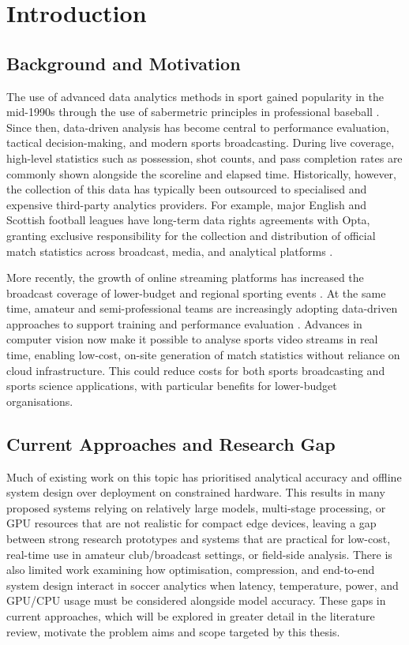\section{Introduction}
\subsection{Background and Motivation}
The use of advanced data analytics methods in sport gained popularity in the mid-1990s through the use of sabermetric principles in professional baseball \cite{Moneyball}. Since then, data-driven analysis has become central to performance evaluation, tactical decision-making, and modern sports broadcasting. During live coverage, high-level statistics such as possession, shot counts, and pass completion rates are commonly shown alongside the scoreline and elapsed time. Historically, however, the collection of this data has typically been outsourced to specialised and expensive third-party analytics providers. For example, major English and Scottish football leagues have long-term data rights agreements with Opta, granting exclusive responsibility for the collection and distribution of official match statistics across broadcast, media, and analytical platforms \cite{StatsPerform}.

More recently, the growth of online streaming platforms has increased the broadcast coverage of lower-budget and regional sporting events \cite{pwc_sports_streaming_2025}. At the same time, amateur and semi-professional teams are increasingly adopting data-driven approaches to support training and performance evaluation \cite{futuremarketinsights_sports_analytics_2025}. Advances in computer vision now make it possible to analyse sports video streams in real time, enabling low-cost, on-site generation of match statistics without reliance on cloud infrastructure. This could reduce costs for both sports broadcasting and sports science applications, with particular benefits for lower-budget organisations.
\subsection{Current Approaches and Research Gap}
 Much of existing work on this topic has prioritised analytical accuracy and offline system design over deployment on constrained hardware. This results in many proposed systems relying on relatively large models, multi-stage processing, or GPU resources that are not realistic for compact edge devices, leaving a gap between strong research prototypes and systems that are practical for low-cost, real-time use in amateur club/broadcast settings, or field-side analysis. There is also limited work examining how optimisation, compression, and end-to-end system design interact in soccer analytics when latency, temperature, power, and GPU/CPU usage must be considered alongside model accuracy. These gaps in current approaches, which will be explored in greater detail in the literature review, motivate the problem aims and scope targeted by this thesis.

